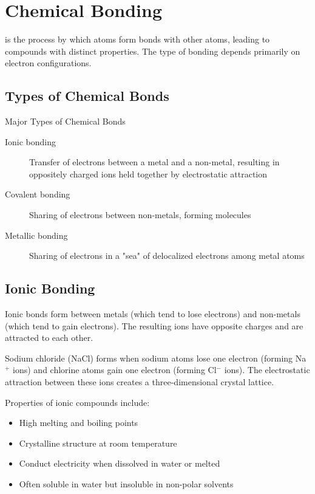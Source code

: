 \section{Chemical Bonding}

 is the process by which atoms form bonds with other atoms, leading to compounds with distinct properties. The type of bonding depends primarily on electron configurations.

\subsection{Types of Chemical Bonds}

\begin{keyconcept}{Major Types of Chemical Bonds}
\begin{description}
    \item[Ionic bonding] Transfer of electrons between a metal and a non-metal, resulting in oppositely charged ions held together by electrostatic attraction
    \item[Covalent bonding] Sharing of electrons between non-metals, forming molecules
    \item[Metallic bonding] Sharing of electrons in a "sea" of delocalized electrons among metal atoms
\end{description}
\end{keyconcept}

\subsection{Ionic Bonding}

Ionic bonds form between metals (which tend to lose electrons) and non-metals (which tend to gain electrons). The resulting ions have opposite charges and are attracted to each other.

\begin{example}
Sodium chloride (NaCl) forms when sodium atoms lose one electron (forming Na$^+$ ions) and chlorine atoms gain one electron (forming Cl$^-$ ions). The electrostatic attraction between these ions creates a three-dimensional crystal lattice.
\end{example}

Properties of ionic compounds include:
\begin{itemize}
    \item High melting and boiling points
    \item Crystalline structure at room temperature
    \item Conduct electricity when dissolved in water or melted
    \item Often soluble in water but insoluble in non-polar solvents
\end{itemize}


